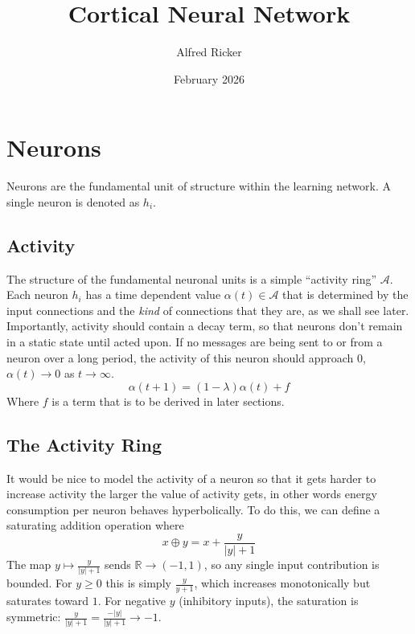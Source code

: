 \documentclass[11pt]{article}
\title{Cortical Neural Network}
\author{Alfred Ricker}
\date{February 2026}
\begin{document}
\maketitle
\section{Neurons}
Neurons are the fundamental unit of structure within the learning network. A single neuron is denoted as $h_i$.

\subsection{Activity}
The structure of the fundamental neuronal units is a simple ``activity ring'' $\mathcal{A}$. Each neuron $h_i$ has a time dependent value $\alpha(t) \in \mathcal{A}$ that is determined by the input connections and the \textit{kind} of connections that they are, as we shall see later.\\

Importantly, activity should contain a decay term, so that neurons don't remain in a static state until acted upon. If no messages are being sent to or from a neuron over a long period, the activity of this neuron should approach $0$, $\alpha(t) \to 0$ as $t \to \infty$.
\begin{equation}
    \alpha(t+1) = (1-\lambda)\alpha(t) + f
\end{equation}
Where $f$ is a term that is to be derived in later sections.

\subsection{The Activity Ring}
It would be nice to model the activity of a neuron so that it gets harder to increase activity the larger the value of activity gets, in other words energy consumption per neuron behaves hyperbolically. To do this, we can define a saturating addition operation where
\begin{equation}
    x \oplus y = x + \frac{y}{|y|+1}
\end{equation}
The map $y \mapsto \frac{y}{|y|+1}$ sends $\mathbb{R} \to (-1, 1)$, so any single input contribution is bounded. For $y \ge 0$ this is simply $\frac{y}{y+1}$, which increases monotonically but saturates toward $1$. For negative $y$ (inhibitory inputs), the saturation is symmetric: $\frac{y}{|y|+1} = \frac{-|y|}{|y|+1} \to -1$.\\
\end{document}
